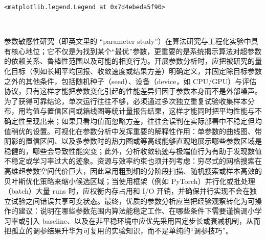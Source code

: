 \documentclass[11pt]{ctexart}
\makeatletter
\newcommand{\boxspacing}{\kern\kvtcb@left@rule\kern\kvtcb@boxsep}
\newcommand{\prompt}[4]{
        {\ttfamily\llap{{\color{#2}[#3]:\hspace{3pt}#4}}\vspace{-\baselineskip}}
    }
\makeatother
\begin{document}
            \begin{tcolorbox}[breakable, size=fbox, boxrule=.5pt, pad at break*=1mm, opacityfill=0]
\prompt{Out}{outcolor}{22}{\boxspacing}
\begin{Verbatim}[commandchars=\\\{\}]
<matplotlib.legend.Legend at 0x7d4ebeda5f90>
\end{Verbatim}
\end{tcolorbox}
        
    \begin{center}
    \end{center}
    { \hspace*{\fill} \\}
    
    参数敏感性研究（即英文里的 ``parameter
study''）在算法研究与工程化实验中具有核心地位；它不仅是为找到某个``最优''参数，更重要的是系统揭示算法对超参数的依赖关系、鲁棒性范围以及可能的相变行为。开展参数分析时，应把被研究的量化目标（例如长期平均回报、收敛速度或结果方差）明确定义，并固定除目标参数之外的其他条件，包括随机种子（seed）、设备（device，如
CPU/GPU）与评估协议，只有这样才能把参数变化引起的性能差异归因于参数本身而不是外部噪声。为了获得可靠结论，单次运行往往不够，必须通过多次独立重复试验收集样本分布，用均值与置信区间或箱线图等统计量报告结果，这样才能同时把平均性能与不确定性呈现出来；如果只看均值而忽略方差，往往会误判在实际部署中不稳定但均值稍优的设置。可视化在参数分析中发挥重要的解释性作用：单参数的曲线图、带阴影的置信区间、以及多参数时的热力图或等高线能够直观地展示哪些参数区域是稳健的，哪些会导致性能突变；此外，分析收敛轨迹与极端值行为有助于发现数值不稳定或学习率过大的迹象。资源与效率约束也须并列考虑：穷尽式的网格搜索在高维超参数空间代价巨大，因此常用粗到细的分阶段扫描、随机搜索或样本高效的贝叶斯优化策略来缩小候选区域；当使用框架（例如
PyTorch）并行化或批处理（batch）大量 runs 时，应权衡内存占用和 I/O
开销，并确保并行实现不会在独立试验之间错误共享可变状态。最终，优质的参数分析应当把经验观察转化为可操作的建议：说明在哪些参数范围内算法能稳定工作、在哪些条件下需要谨慎调小学习率或引入
baseline、以及在非平稳环境中应优先采用固定步长或衰减机制，从而把孤立的调参结果升华为可复用的实验知识，而不是单纯的``调参技巧''。


    
    
    
\end{document}
